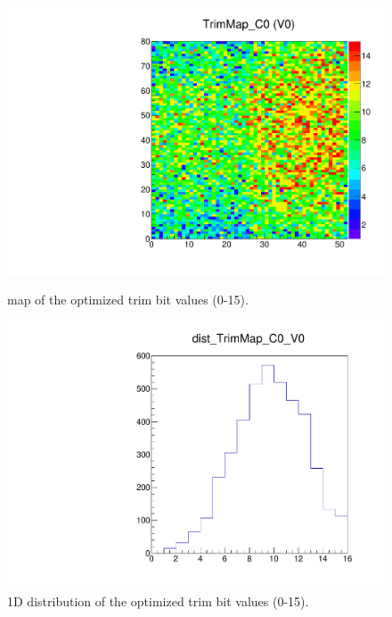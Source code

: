 \begin{figure}[!Hp]
\centering
\begin{minipage}{0.45\textwidth}
  \includegraphics[width=1.0\textwidth]{figures/trim_TrimMap.pdf}
  \caption{\roc map of the optimized trim bit values (0-15).}
  \label{fig:trim_TrimMap}
\end{minipage}
\hspace{0.3cm}
\begin{minipage}{0.45\textwidth}
  \includegraphics[width=1.0\textwidth]{figures/trim_dist_TrimMap.pdf}
  \caption{1D distribution of the optimized trim bit values (0-15).}
  \label{fig:trim_dist_TrimMap}
\end{minipage}
\end{figure}


